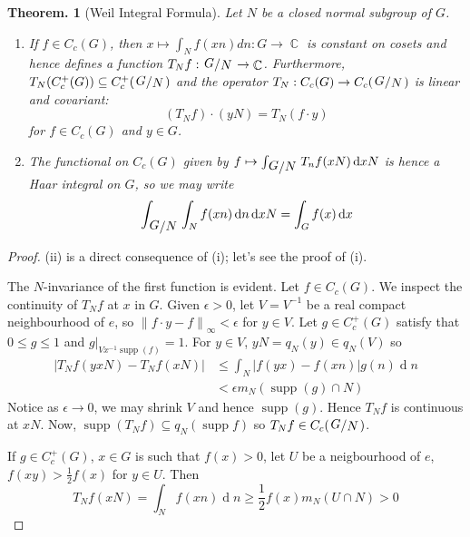 \documentclass[11pt, a4paper]{memoir}
\DeclareMathOperator{\C}{{\mathbb{C}}}
\newcommand{\norm}[1]{\ensuremath{\left\lVert#1\right\rVert}}
\theoremstyle{change}
\newtheorem{theorem}{Theorem.}[section]
\theoremstyle{plain}
\theoremstyle{nonumberplain}
\newtheorem{proof}{Proof}
\newcommand{\quot}[2]{\mathchoice{\left.\raisebox{0.14em}{$#1$}\middle/\raisebox{-0.14em}{$#2$}\right.}
                                 {\left.\raisebox{0.08em}{$#1$}\middle/\raisebox{-0.08em}{$#2$}\right.}
                                 {\left.\raisebox{0.03em}{$#1$}\middle/\raisebox{-0.03em}{$#2$}\right.}
                                 {\left.\raisebox{0em}{$#1$}\middle/\raisebox{0em}{$#2$}\right.}}
\DeclareMathOperator{\supp}{supp}
\renewcommand{\d}[1]{\ensuremath{\operatorname{d}\!{#1}}}
\numberwithin{equation}{section}
\begin{document}
\begin{theorem}[Weil Integral Formula]
    Let $N$ be a closed normal subgroup of $G$.
    \begin{enumerate}[nl,r]
        \item If $f\in C_c(G)$, then $x\mapsto\int_Nf(xn)dn:G\to\C$ is constant on cosets and hence defines a function $T_Nf:\quot{G}{N}\to\C$.
            Furthermore, $T_N(C_c^+(G))\subseteq C_c^+(\quot{G}{N})$ and the operator $T_N:C_c(G)\to C_c(\quot{G}{N})$ is linear and covariant:
            \begin{equation*}
                (T_Nf)\cdot(yN)=T_N(f\cdot y)
            \end{equation*}
            for $f\in C_c(G)$ and $y\in G$.
        \item The functional on $C_c(G)$ given by $f\mapsto\int_{\quot{G}{N}}T_nf(xN)\d{x}N$ is hence a Haar integral on $G$, so we may write
            \begin{equation*}
                \int_{\quot{G}{N}}\int_Nf(xn)\d{n}\d{xN}=\int_G f(x)\d{x}
            \end{equation*}
    \end{enumerate}
\end{theorem}
\begin{proof}
    (ii) is a direct consequence of (i); let's see the proof of (i).

    The $N$-invariance of the first function is evident.
    Let $f\in C_c(G)$.
    We inspect the continuity of $T_Nf$ at $x$ in $G$.
    Given $\epsilon>0$, let $V=V^{-1}$ be a real compact neighbourhood of $e$, so $\norm{f\cdot y-f}_\infty<\epsilon$ for $y\in V$.
    Let $g\in C_c^+(G)$ satisfy that $0\leq g\leq 1$ and $g|_{Vx^{-1}\supp(f)}=1$.
    For $y\in V$, $yN=q_N(y)\in q_N(V)$ so
    \begin{align*}
        |T_Nf(yxN)-T_Nf(xN)| &\leq\int_N|f(yx)-f(xn)|g(n)\d{n}\\
                             &<\epsilon m_N(\supp(g)\cap N)
    \end{align*}
    Notice as $\epsilon\to 0$, we may shrink $V$ and hence $\supp(g)$.
    Hence $T_Nf$ is continuous at $xN$.
    Now, $\supp(T_Nf)\subseteq q_N(\supp f)$ so $T_Nf\in C_c(\quot{G}{N})$.

    If $g\in C_c^+(G)$, $x\in G$ is such that $f(x)>0$, let $U$ be a neigbourhood of $e$, $f(xy)>\frac{1}{2}f(x)$ for $y\in U$.
    Then
    \begin{equation*}
        T_Nf(xN)=\int_N f(xn)\d{n}\geq\frac{1}{2}f(x)m_N(U\cap N)>0
    \end{equation*}
\end{proof}
\end{document}
